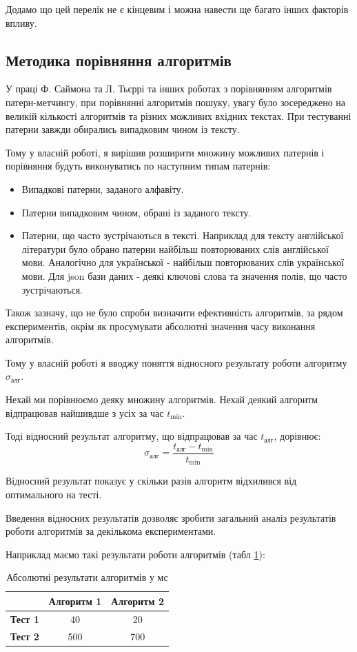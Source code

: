 \documentclass[a4paper,14pt]{extarticle} %
\begin{document}
	Додамо що цей перелік не є кінцевим і можна навести ще багато інших факторів впливу.

	\subsection{Методика порівняння алгоритмів}\label{methodic}

	У праці Ф. Саймона та Л. Тьєррі \cite{experiment} та інших роботах з порівнянням алгоритмів патерн-метчингу, при порівнянні алгоритмів пошуку, увагу було зосереджено на великій кількості алгоритмів та різних можливих вхідних текстах.
	При тестуванні патерни завжди обирались випадковим чином із тексту.

	Тому у власній роботі, я вирішив розширити множину можливих патернів і порівняння будуть виконуватись по наступним типам патернів:
	\begin{itemize}
		\item Випадкові патерни, заданого алфавіту.
		\item Патерни випадковим чином, обрані із заданого тексту.
		\item Патерни, що часто зустрічаються в тексті. Наприклад для тексту англійської літератури було обрано патерни найбільш повторюваних слів англійської мови. Аналогічно для української - найбільш повторюваних слів української мови. Для json бази даних - деякі ключові слова та значення полів, що часто зустрічаються.
	\end {itemize}

	Також зазначу, що не було спроби визначити ефективність алгоритмів, за рядом експериментів, окрім як просумувати абсолютні значення часу виконання алгоритмів.

	Тому у власній роботі я вводжу поняття відносного результату роботи алгоритму $\sigma_{\text{алг}}$.

	Нехай ми порівнюємо деяку множину алгоритмів. Нехай деякий алгоритм відпрацював найшивдше з усіх за час $t_{\text{min}}$.

	Тоді відносний результат алгоритму, що відпрацював за час $t_{\text{алг}}$, дорівнює:
	$$\sigma_{\text{алг}} = \frac{t_{\text{алг}}-t_{\text{min}}}{t_{\text{min}}}$$
    
	Відносний результат показує у скільки разів алгоритм відхилився від оптимального на тесті.
	
	Введення відносних результатів дозволяє зробити загальний аналіз результатів роботи алгоритмів за декількома експериментами.

	Наприклад маємо такі результати роботи алгоритмів (табл \ref{table:times}):
	\begin{table}[H]
		\centering
		\begin{tabular}{|c|c|c|}
			\hline
			& \textbf{Алгоритм 1} & \textbf{Алгоритм 2} \\ 
			\hline
			\textbf{Тест 1} & 40 & 20 \\ 
			\hline
			\textbf{Тест 2} & 500 & 700 \\ 
			\hline
		\end{tabular}
		\caption{Абсолютні результати алгоритмів у мс}
		\label{table:times}
	\end{table}
\end{document}
